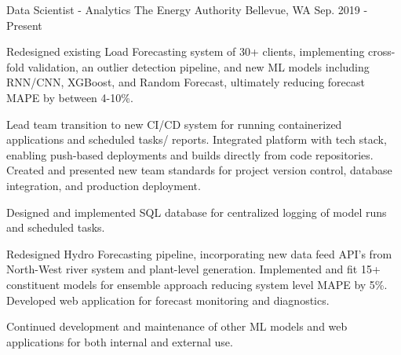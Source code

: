 

\begin{cventries}

  \cventry
    {Data Scientist - Analytics} %
    {The Energy Authority} %
    {Bellevue, WA} %
    {Sep. 2019 - Present} %
    {
      \begin{cvitems} %
        \item {Redesigned existing Load Forecasting system of 30+ clients, implementing cross-fold validation, an outlier detection pipeline, and new ML models including RNN/CNN, XGBoost, and Random Forecast, ultimately reducing forecast MAPE by between 4-10\%.}
        \item {Lead team transition to new CI/CD system for running containerized applications and scheduled tasks/ reports. Integrated platform with tech stack, enabling push-based deployments and builds directly from code repositories. Created and presented new team standards for project version control, database integration, and production deployment.}
        \item {Designed and implemented SQL database for centralized logging of model runs and scheduled tasks.}
        \item {Redesigned Hydro Forecasting pipeline, incorporating new data feed API's from North-West river system and plant-level generation. Implemented and fit 15+ constituent models for ensemble approach reducing system level MAPE by 5\%. Developed web application for forecast monitoring and diagnostics.}
        \item {Continued development and maintenance of other ML models and web applications for both internal and external use.}
      \end{cvitems}
    }


\end{cventries}
